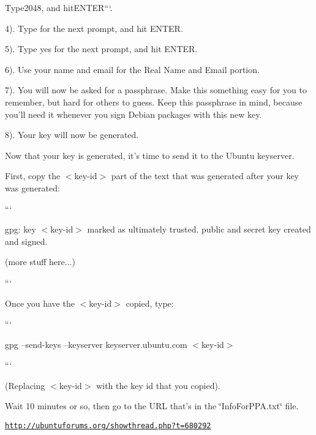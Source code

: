 {\ttfamily  Type}2048{\ttfamily , and hit}E\-N\-T\-E\-R```.

4). Type {} for the next prompt, and hit {\ttfamily E\-N\-T\-E\-R}.

5). Type {\ttfamily yes} for the next prompt, and hit {\ttfamily E\-N\-T\-E\-R}.

6). Use your name and email for the Real Name and Email portion.

7). You will now be asked for a passphrase. Make this something easy for you to remember, but hard for others to guess. Keep this passphrase in mind, because you'll need it whenever you sign Debian packages with this new key.

8). Your key will now be generated.

Now that your key is generated, it's time to send it to the Ubuntu keyserver.

First, copy the {\ttfamily $<$key-\/id$>$} part of the text that was generated after your key was generated\-:

```

gpg\-: key $<$key-\/id$>$ marked as ultimately trusted. public and secret key created and signed.

(more stuff here...)

```

Once you have the {\ttfamily $<$key-\/id$>$} copied, type\-:

```

gpg --send-\/keys --keyserver keyserver.\-ubuntu.\-com $<$key-\/id$>$

```

(Replacing {\ttfamily $<$key-\/id$>$} with the key id that you copied).

Wait 10 minutes or so, then go to the U\-R\-L that's in the \char`\"{}\-Info\-For\-P\-P\-A.\-txt\char`\"{} file.

\href{http://ubuntuforums.org/showthread.php?t=680292}{\tt http\-://ubuntuforums.\-org/showthread.\-php?t=680292} 